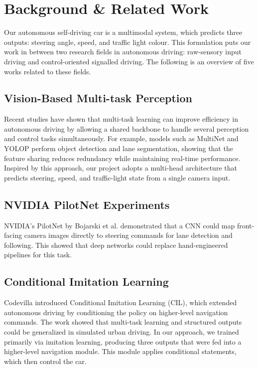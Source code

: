 \documentclass{article} %
\begin{document}
\section{Background \& Related Work}
Our autonomous self-driving car is a multimodal system, which predicts three outputs: steering angle, speed, and traffic light colour. 
This formulation puts our work in between two research fields in autonomous driving: raw-sensory input driving and control-oriented signalled driving. 
The following is an overview of five works related to these fields.

\subsection{Vision-Based Multi-task Perception \citep{3.1Ref}}
Recent studies have shown that multi-task learning can improve efficiency in autonomous driving by allowing a shared backbone to 
handle several perception and control tasks simultaneously. For example, models such as MultiNet and YOLOP perform object detection and 
lane segmentation, showing that the feature sharing reduces redundancy while maintaining real-time performance. Inspired by this approach, 
our project adopts a multi-head architecture that predicts steering, speed, and traffic-light state from a single camera input.

\subsection{NVIDIA PilotNet Experiments \citep{3.2Ref}}
NVIDIA’s PilotNet by Bojarski et al. demonstrated that a CNN could map front-facing camera images 
directly to steering commands for lane detection and following. 
This showed that deep networks could replace hand-engineered pipelines for this task.

\subsection{Conditional Imitation Learning \citep{3.3Ref}}
Codevilla introduced Conditional Imitation Learning (CIL), which extended autonomous driving by conditioning the policy 
on higher-level navigation commands. The work showed that multi-task learning and structured outputs could be generalized 
in simulated urban driving. In our approach, we trained primarily via imitation learning, producing three outputs that were 
fed into a higher-level navigation module. This module applies conditional statements, which then control the car.
\end{document}

